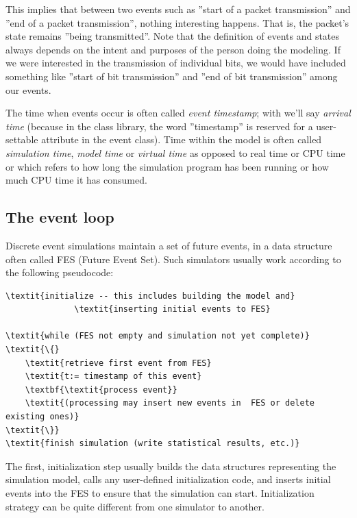This implies that between two events such as ''start of a packet
transmission'' and ''end of a packet transmission'', nothing
interesting happens. That is, the packet's state remains ''being
transmitted''. Note that the definition of events and states always
depends on the intent and purposes of the person doing the modeling.
If we were interested in the transmission of individual bits, we would
have included something like ''start of bit transmission'' and ''end
of bit transmission'' among our events.


The time when events occur is often called \textit{event
  timestamp}; with {\opp} we'll say
\textit{arrival time} (because in the class
library, the word ''timestamp'' is reserved for a user-settable
attribute in the event class). Time within the model is often called
\textit{simulation time}, \textit{model
  time} or \textit{virtual time}
as opposed to real time or CPU time
or which refers to how long the simulation program has been running or
how much CPU time it has consumed.





\subsection{The event loop}

Discrete event simulations maintain a set of future
events, in a data structure often called
FES (Future Event Set). Such simulators usually work
according to the following pseudocode:

\begin{Verbatim}[commandchars=\\\{\}]
\textit{initialize -- this includes building the model and}
              \textit{inserting initial events to FES}

\textit{while (FES not empty and simulation not yet complete)}
\textit{\{}
    \textit{retrieve first event from FES}
    \textit{t:= timestamp of this event} 
    \textbf{\textit{process event}} 
    \textit{(processing may insert new events in  FES or delete existing ones)}
\textit{\}}
\textit{finish simulation (write statistical results, etc.)}
\end{Verbatim}


The first, initialization step usually builds the data structures
representing the simulation model, calls any user-defined
initialization code, and inserts initial events
into the FES to ensure that the simulation can start. Initialization
strategy can be quite different from one simulator to another.


